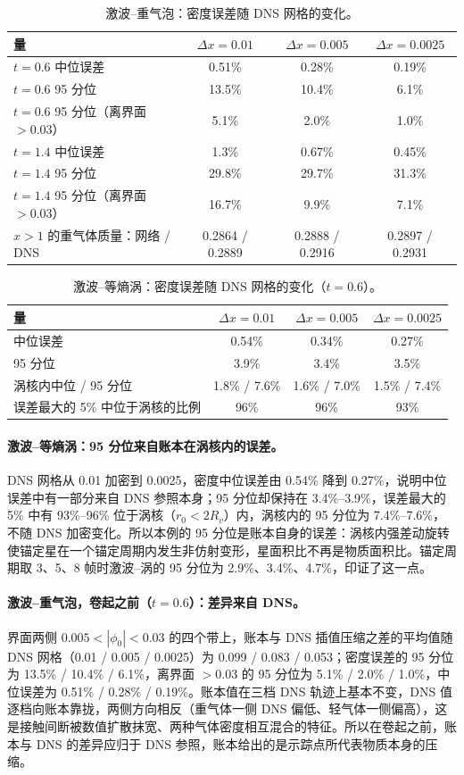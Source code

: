 \begin{table}[!htbp]\centering\small\caption{激波–重气泡：密度误差随 DNS 网格的变化。}
\begin{tabular}{lccc}\toprule
量 & $\Delta x=0.01$ & $\Delta x=0.005$ & $\Delta x=0.0025$\\\midrule
$t=0.6$ 中位误差 & 0.51\% & 0.28\% & 0.19\%\\
$t=0.6$ 95 分位 & 13.5\% & 10.4\% & 6.1\%\\
$t=0.6$ 95 分位（离界面 $>0.03$） & 5.1\% & 2.0\% & 1.0\%\\
$t=1.4$ 中位误差 & 1.3\% & 0.67\% & 0.45\%\\
$t=1.4$ 95 分位 & 29.8\% & 29.7\% & 31.3\%\\
$t=1.4$ 95 分位（离界面 $>0.03$） & 16.7\% & 9.9\% & 7.1\%\\
$x>1$ 的重气体质量：网络 / DNS & 0.2864 / 0.2889 & 0.2888 / 0.2916 & 0.2897 / 0.2931\\\bottomrule\end{tabular}\end{table}
\begin{table}[!htbp]\centering\small\caption{激波–等熵涡：密度误差随 DNS 网格的变化（$t=0.6$）。}
\begin{tabular}{lccc}\toprule
量 & $\Delta x=0.01$ & $\Delta x=0.005$ & $\Delta x=0.0025$\\\midrule
中位误差 & 0.54\% & 0.34\% & 0.27\%\\
95 分位 & 3.9\% & 3.4\% & 3.5\%\\
涡核内中位 / 95 分位 & 1.8\% / 7.6\% & 1.6\% / 7.0\% & 1.5\% / 7.4\%\\
误差最大的 5\% 中位于涡核的比例 & 96\% & 96\% & 93\%\\\bottomrule
\end{tabular}\end{table}
\paragraph{激波–等熵涡：95 分位来自账本在涡核内的误差。}DNS 网格从 0.01 加密到 0.0025，密度中位误差由 0.54\% 降到 0.27\%，说明中位误差中有一部分来自 DNS 参照本身；95 分位却保持在 3.4\%–3.9\%，误差最大的 5\% 中有 93\%–96\% 位于涡核（$r_0<2R_v$）内，涡核内的 95 分位为 7.4\%–7.6\%，不随 DNS 加密变化。所以本例的 95 分位是账本自身的误差：涡核内强差动旋转使锚定星在一个锚定周期内发生非仿射变形，星面积比不再是物质面积比。锚定周期取 3、5、8 帧时激波–涡的 95 分位为 2.9\%、3.4\%、4.7\%，印证了这一点。
\paragraph{激波–重气泡，卷起之前（$t=0.6$）：差异来自 DNS。}界面两侧 $0.005<|\phi_0|<0.03$ 的四个带上，账本与 DNS 插值压缩之差的平均值随 DNS 网格（0.01 / 0.005 / 0.0025）为 0.099 / 0.083 / 0.053；密度误差的 95 分位为 13.5\% / 10.4\% / 6.1\%，离界面 $>0.03$ 的 95 分位为 5.1\% / 2.0\% / 1.0\%，中位误差为 0.51\% / 0.28\% / 0.19\%。账本值在三档 DNS 轨迹上基本不变，DNS 值逐档向账本靠拢，两侧方向相反（重气体一侧 DNS 偏低、轻气体一侧偏高），这是接触间断被数值扩散抹宽、两种气体密度相互混合的特征。所以在卷起之前，账本与 DNS 的差异应归于 DNS 参照，账本给出的是示踪点所代表物质本身的压缩。
